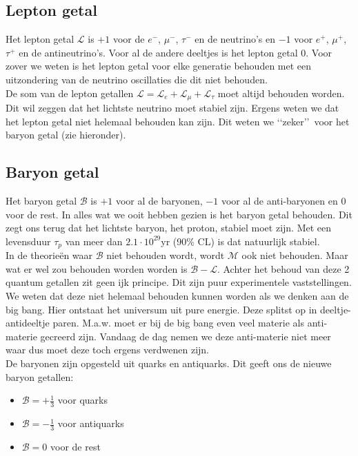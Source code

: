 \documentclass[../main.tex]{subfiles}
\begin{document}
\subsection{Lepton getal}%
\label{sub:lepton_getal}

Het lepton getal $\mathcal{L}$ is $+1$ voor de $e^-$, $\mu^-$, $\tau^-$ en de neutrino's en $-1$ voor $e^+$, $\mu^+$, $\tau^+$ en de antineutrino's. Voor al de andere deeltjes is het lepton getal $0$. Voor zover we weten is het lepton getal voor elke generatie behouden met een uitzondering van de neutrino oscillaties die dit niet behouden.\\
De som van de lepton getallen $\mathcal{L} = \mathcal{L}_e + \mathcal{L}_\mu + \mathcal{L}_\tau$ moet altijd behouden worden. Dit wil zeggen dat het lichtste neutrino moet stabiel zijn. Ergens weten we dat het lepton getal niet helemaal behouden kan zijn. Dit weten we \lq\lq zeker\rq\rq\  voor het baryon getal (zie hieronder).

\subsection{Baryon getal}%
\label{sub:baryon_getal}

Het baryon getal $\mathcal{B}$ is $+1$ voor al de baryonen, $-1$ voor al de anti-baryonen en $0$ voor de rest. In alles wat we ooit hebben gezien is het baryon getal behouden. Dit zegt ons terug dat het lichtste baryon, het proton, stabiel moet zijn. Met een levensduur  $\tau_p$ van meer dan $2.1\cdot 10^{29}$yr (90\% CL) is dat natuurlijk stabiel.\\
In de theorieën waar $\mathcal{B}$ niet behouden wordt, wordt $\mathcal{M}$ ook niet behouden. Maar wat er wel zou behouden worden worden is $\mathcal{B-L}$. Achter het behoud van deze 2 quantum getallen zit geen ijk principe. Dit zijn puur experimentele vaststellingen.  We weten dat deze niet helemaal behouden kunnen worden als we denken aan de big bang. Hier ontstaat het universum uit pure energie. Deze splitst op in deeltje-antideeltje paren. M.a.w. moet er bij de big bang even veel materie als anti-materie gecreerd zijn. Vandaag de dag nemen we deze anti-materie niet meer waar dus moet deze toch ergens verdwenen zijn.\\
De baryonen zijn opgesteld uit quarks en antiquarks. Dit geeft ons de nieuwe baryon getallen:
\begin{itemize}
    \item $\mathcal{B} = +\frac{1}{3}$ voor quarks
    \item $\mathcal{B} = -\frac{1}{3}$ voor antiquarks
    \item $\mathcal{B} = 0$ voor de rest
\end{itemize}
\end{document}
